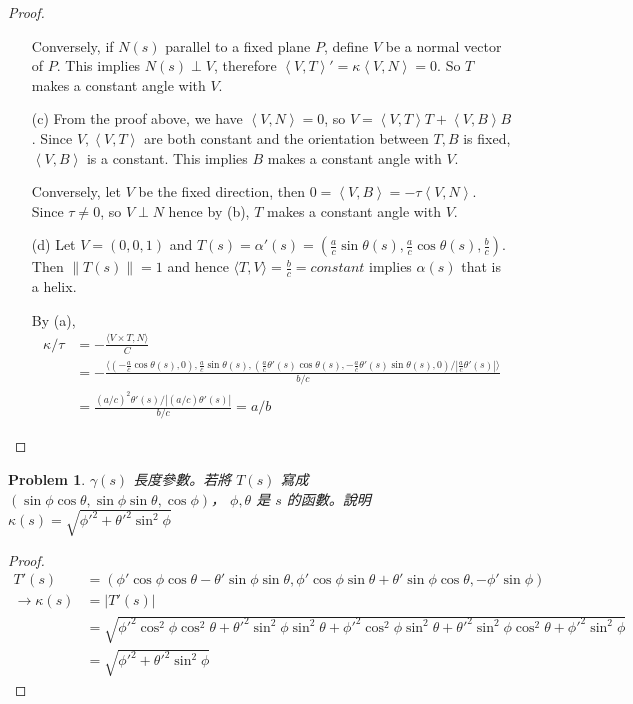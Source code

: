 \documentclass[10pt,a4paper]{article}
\newcounter{theProblemCounter}
\newtheorem{problem}[theProblemCounter]{Problem}
\begin{document}
\begin{proof}
\begin{enumerate}
Conversely, if $N(s)$ parallel to a fixed plane $P$, define $V$ be a normal vector of $P$. This implies $N(s)\perp V$, therefore $\left\langle V, T\right\rangle' = \kappa\left\langle V, N\right\rangle = 0$. So $T$ makes a constant angle with $V$.
\item[(c)]
From the proof above, we have $\left\langle V, N\right\rangle = 0$, so $V = \left\langle V, T\right\rangle T + \left\langle V, B\right\rangle B$. Since $V, \left\langle V, T\right\rangle$ are both constant and the orientation between $T, B$ is fixed, $\left\langle V, B\right\rangle$ is a constant. This implies $B$ makes a constant angle with $V$.

Conversely, let $V$ be the fixed direction, then $0=\left\langle V, B\right\rangle = -\tau\left\langle V, N\right\rangle$. Since $\tau\ne 0$, so $V\perp N$ hence by (b), $T$ makes a constant angle with $V$.
\item[(d)]
Let $V = (0, 0, 1)$ and $T(s) = \alpha'(s) = \left(\frac{a}{c}\sin\theta(s), \frac{a}{c}\cos\theta(s), \frac{b}{c}\right)$. Then $\|T(s)\| = 1$ and hence $\langle T, V\rangle = \frac bc = constant$ implies $\alpha(s)$ that is a helix. \par
By (a), 
\begin{align*}
\kappa/\tau &=-\frac{\langle V\times T,N\rangle}{C} \\
&= -\frac{\langle (-\frac{a}{c}\cos\theta(s), 0), \frac{a}{c}\sin\theta(s), (\frac ac\theta'(s)\cos\theta(s), -\frac ac\theta'(s)\sin\theta(s), 0)/\left|\frac ac\theta'(s)\right|\rangle}{b/c} \\
&= \frac {(a/c)^2\theta'(s)/\left|(a/c)\theta'(s)\right|}{b/c} = a/b
\end{align*}
\end{enumerate}
\end{proof}

\setcounter{theProblemCounter}{5}
\begin{problem}
$\gamma(s)$ 長度參數。若將 $T(s)$ 寫成 $(\sin\phi\cos\theta, \sin\phi\sin\theta, \cos\phi)$， $\phi,\theta$ 是 $s$ 的函數。說明 $\kappa(s)=\sqrt{\phi'^2+\theta'^2\sin^2\phi}$
\end{problem}
\begin{proof}
\begin{align*}
T'(s)&=(\phi'\cos\phi\cos\theta-\theta'\sin\phi\sin\theta,\phi'\cos\phi\sin\theta+\theta'\sin\phi\cos\theta,-\phi'\sin\phi)\\
\rightarrow\kappa(s)&=\left|T'(s)\right|\\
&=\sqrt{\phi'^2\cos^2\phi\cos^2\theta+\theta'^2\sin^2\phi\sin^2\theta+\phi'^2\cos^2\phi\sin^2\theta+\theta'^2\sin^2\phi\cos^2\theta+\phi'^2\sin^2\phi}\\
&=\sqrt{\phi'^2+\theta'^2\sin^2\phi}
\end{align*}
\end{proof}
\end{document}
